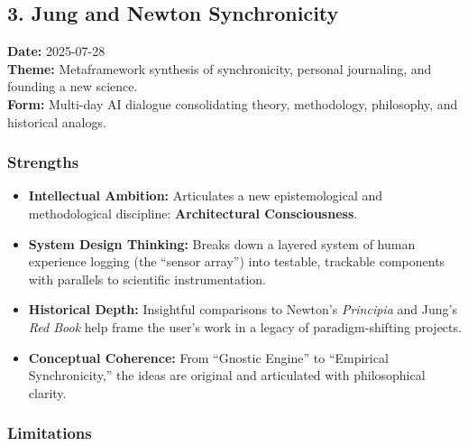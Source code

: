 \documentclass{article}
\begin{document}
\subsection*{}\label{section-7}

\subsection*{}\label{section-8}

\subsection*{\texorpdfstring{\textbf{ 3. Jung and Newton
Synchronicity}}{ 3. Jung and Newton Synchronicity}}\label{jung-and-newton-synchronicity}

\textbf{Date:} 2025-07-28\\
\textbf{Theme:} Metaframework synthesis of synchronicity, personal
journaling, and founding a new science.\\
\textbf{Form:} Multi-day AI dialogue consolidating theory, methodology,
philosophy, and historical analogs.

\subsubsection*{\texorpdfstring{\textbf{Strengths}}{Strengths}}\label{strengths-2}

\begin{itemize}
\item
  \textbf{Intellectual Ambition:} Articulates a new epistemological and
  methodological discipline: \textbf{Architectural Consciousness}.
\item
  \textbf{System Design Thinking:} Breaks down a layered system of human
  experience logging (the ``sensor array'') into testable, trackable
  components with parallels to scientific instrumentation.
\item
  \textbf{Historical Depth:} Insightful comparisons to Newton's
  \emph{Principia} and Jung's \emph{Red Book} help frame the user's work
  in a legacy of paradigm-shifting projects.
\item
  \textbf{Conceptual Coherence:} From ``Gnostic Engine'' to ``Empirical
  Synchronicity,'' the ideas are original and articulated with
  philosophical clarity.
\end{itemize}

\subsubsection*{\texorpdfstring{\textbf{Limitations}}{Limitations}}\label{limitations-2}
\end{document}
